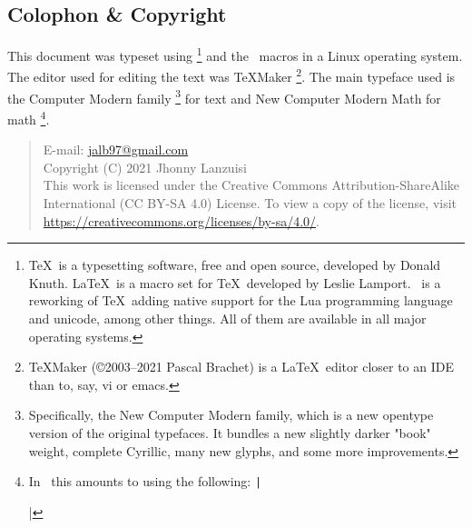 \newpage
\begin{small}
    \begin{center}
    \begin{minipage}{0.4\paperwidth}
        \section*{Colophon \& Copyright}
        This document was typeset using \LuaTeX%
        \footnote{%
            \TeX\ is
            a typesetting software, free and open source,
            developed by Donald Knuth. \LaTeX\ is a macro
            set for \TeX\ developed by Leslie Lamport. \LuaTeX\ is
            a reworking of \TeX\ adding native support for the Lua
            programming language and unicode, among other things.
            All of them are available in all major
            operating systems.
        }
        and the \LaTeXe\ macros in a Linux operating system.
        The editor used for editing the text was \TeX Maker%
        \footnote{%
            \TeX Maker (©2003--2021 Pascal Brachet)
            is a \LaTeX\ editor closer to an IDE than to,
            say, vi or emacs.
        }.
        The main typeface used is the Computer Modern family%
        \footnote{%
            Specifically, the New Computer Modern family,
            which is a new opentype version of the original
            typefaces. It bundles a new slightly darker "book"
            weight, complete Cyrillic, many new glyphs, 
            and some more improvements.
        }
        for text and New Computer Modern Math for math%
        \footnote{%
            In \LuaLaTeX\ this amounts to using the following:
            \texttt|\usepackage[default]{fontsetup}|
        }.

        \medskip
        \begin{quote}\ttfamily\raggedright\footnotesize%
            E-mail: \url{jalb97@gmail.com} \\
            Copyright (C) 2021 Jhonny Lanzuisi \\
            This work is licensed under the Creative Commons Attribution-ShareAlike
            International (CC BY-SA 4.0)  License. To view a copy of the license,
            visit \url{https://creativecommons.org/licenses/by-sa/4.0/}.
        \end{quote}
    \end{minipage}
    \end{center}
\end{small}
\newpage
\tableofcontents
